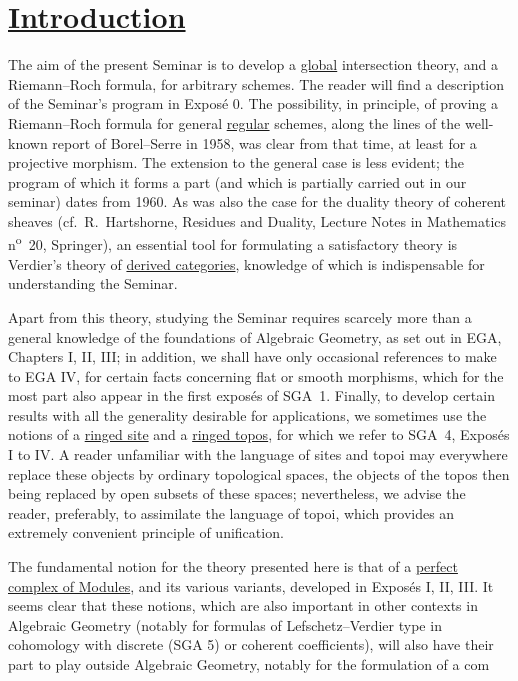 \section*{\underline{Introduction}}
The aim of the present Seminar is to develop a \underline{global} intersection theory, and a Riemann--Roch formula, for arbitrary schemes. The reader will find a description of the Seminar's program in Exposé 0. The possibility, in principle, of proving a Riemann--Roch formula for general \underline{regular} schemes, along the lines of the well-known report of Borel--Serre in 1958, was clear from that time, at least for a projective morphism. The extension to the general case is less evident; the program of which it forms a part (and which is partially carried out in our seminar) dates from 1960. As was also the case for the duality theory of coherent sheaves (cf.\ R.~Hartshorne, Residues and Duality, Lecture Notes in Mathematics n\textsuperscript{o}~20, Springer), an essential tool for formulating a satisfactory theory is Verdier's theory of \underline{derived categories}, knowledge of which is indispensable for understanding the Seminar.

Apart from this theory, studying the Seminar requires scarcely more than a general knowledge of the foundations of Algebraic Geometry, as set out in EGA, Chapters I, II, III; in addition, we shall have only occasional references to make to EGA IV, for certain facts concerning flat or smooth morphisms, which for the most part also appear in the first exposés of SGA~1. Finally, to develop certain results with all the generality desirable for applications, we sometimes use the notions of a \underline{ringed site} and a \underline{ringed topos}, for which we refer to SGA~4, Exposés I to IV. A reader unfamiliar with the language of sites and topoi may everywhere replace these objects by ordinary topological spaces, the objects of the topos then being replaced by open subsets of these spaces; nevertheless, we advise the reader, preferably, to assimilate the language of topoi, which provides an extremely convenient principle of unification.

The fundamental notion for the theory presented here is that of a \underline{perfect complex of Modules}, and its various variants, developed in Exposés I, II, III. It seems clear that these notions, which are also important in other contexts in Algebraic Geometry (notably for formulas of Lefschetz--Verdier type in cohomology with discrete (SGA 5) or coherent coefficients), will also have their part to play outside Algebraic Geometry, notably for the formulation of a com%
